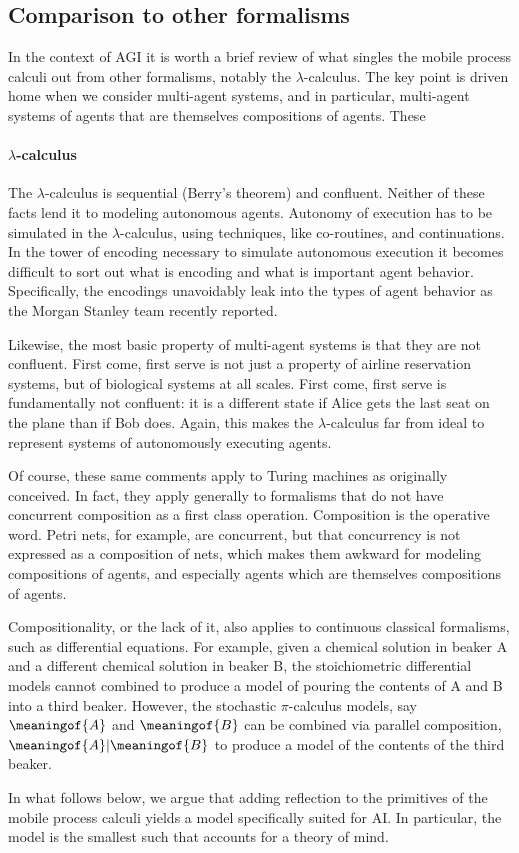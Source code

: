 \subsection{Comparison to other formalisms}
In the context of AGI it is worth a brief review of what singles the mobile process calculi out from other formalisms, notably the $\lambda$-calculus. The key point is driven home when we consider multi-agent systems, and in particular, multi-agent systems of agents that are themselves compositions of agents. These 

\paragraph{$\lambda$-calculus} The $\lambda$-calculus is sequential (Berry's theorem) and confluent. Neither of these facts lend it to modeling autonomous agents. Autonomy of execution has to be simulated in the $\lambda$-calculus, using techniques, like co-routines, and continuations. In the tower of encoding necessary to simulate autonomous execution it becomes difficult to sort out what is encoding and what is important agent behavior. Specifically, the encodings unavoidably leak into the types of agent behavior as the Morgan Stanley team recently reported.

Likewise, the most basic property of multi-agent systems is that they are not confluent. First come, first serve is not just a property of airline reservation systems, but of biological systems at all scales. First come, first serve is fundamentally not confluent: it is a different state if Alice gets the last seat on the plane than if Bob does. Again, this makes the $\lambda$-calculus far from ideal to represent systems of autonomously executing agents.

Of course, these same comments apply to Turing machines as originally conceived. In fact, they apply generally to formalisms that do not have concurrent composition as a first class operation. Composition is the operative word. Petri nets, for example, are concurrent, but that concurrency is not expressed as a composition of nets, which makes them awkward for modeling compositions of agents, and especially agents which are themselves compositions of agents.

Compositionality, or the lack of it, also applies to continuous
classical formalisms, such as differential equations. For example,
given a chemical solution in beaker A and a different chemical
solution in beaker B, the stoichiometric differential models cannot
combined to produce a model of pouring the contents of A and B into a
third beaker. However, the stochastic $\pi$-calculus models, say
$\meaningof{A}$ and $\meaningof{B}$ can be combined via parallel
composition, $\meaningof{A}|\meaningof{B}$ to produce a model of the
contents of the third beaker.

In what follows below, we argue that adding reflection to the
primitives of the mobile process calculi yields a model specifically
suited for AI. In particular, the model is the smallest such that
accounts for a theory of mind.

